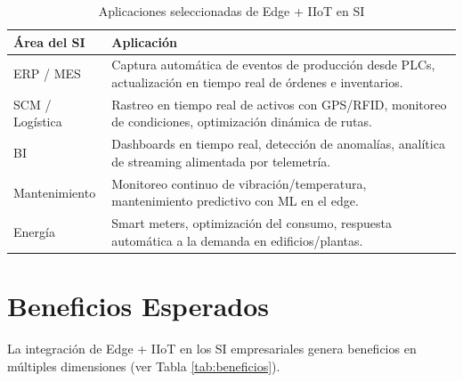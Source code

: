 ﻿\documentclass[12pt,a4paper,oneside]{article}
\begin{document}
\begin{table}[h!]
\centering
\caption{Aplicaciones seleccionadas de Edge + IIoT en SI}
\label{tab:aplicaciones}
\begin{tabular}{p{4cm} p{10cm}}
\toprule
\textbf{Área del SI} & \textbf{Aplicación} \\
\midrule
ERP / MES & Captura automática de eventos de producción desde PLCs, actualización en tiempo real de órdenes e inventarios. \\
SCM / Logística & Rastreo en tiempo real de activos con GPS/RFID, monitoreo de condiciones, optimización dinámica de rutas. \\
BI & Dashboards en tiempo real, detección de anomalías, analítica de streaming alimentada por telemetría. \\
Mantenimiento & Monitoreo continuo de vibración/temperatura, mantenimiento predictivo con ML en el edge. \\
Energía & Smart meters, optimización del consumo, respuesta automática a la demanda en edificios/plantas. \\
\bottomrule
\end{tabular}
\end{table}

\section{Beneficios Esperados}

La integración de Edge + IIoT en los SI empresariales genera beneficios en múltiples dimensiones (ver Tabla \ref{tab:beneficios}).
\end{document}
